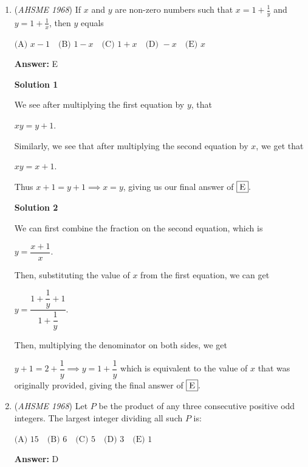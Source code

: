 \begin{enumerate}
 \textbf{Answer: }B



\textbf{Solution}

By Vieta's Theorem, $mn = n$ and $-(m + n) = m$. Dividing the first equation by $n$ gives $m = 1$. Multiplying the 2nd by -1 gives $m + n = -m$. The RHS is -1, so the answer is $\fbox{B}$



	\item (\textit{AHSME 1968}) If $x$ and $y$ are non-zero numbers such that $x=1+\frac{1}{y}$ and $y=1+\frac{1}{x}$, then $y$ equals


 $\text{(A) } x-1\quad \text{(B) } 1-x\quad \text{(C) } 1+x\quad \text{(D) } -x\quad \text{(E) } x$

 \textbf{Answer: }E



\textbf{Solution 1}

We see after multiplying the first equation by $y$, that 

 $xy=y+1.$

 Similarly, we see that after multiplying the second equation by $x$, we get that 

 $xy=x+1.$

 Thus $x+1=y+1 \implies x=y$, giving us our final answer of $\fbox{E}.$




\textbf{Solution 2}

We can first combine the fraction on the second equation, which is

 $y=\dfrac{x+1}{x}.$

 Then, substituting the value of $x$ from the first equation, we can get

 $y=\dfrac{1+\dfrac{1}{y}+1}{1+\dfrac{1}{y}}.$

 Then, multiplying the denominator on both sides, we get

 $y+1=2+\dfrac{1}{y} \implies y=1+\dfrac{1}{y}$ which is equivalent to the value of $x$ that was originally provided, giving the final answer of $\fbox{E}.$



	\item (\textit{AHSME 1968}) Let $P$ be the product of any three consecutive positive odd integers. The largest integer dividing all such $P$ is:


 $\text{(A) } 15\quad \text{(B) } 6\quad \text{(C) } 5\quad \text{(D) } 3\quad \text{(E) } 1$

 \textbf{Answer: }D




\end{enumerate}
